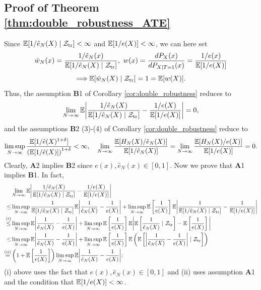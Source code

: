 \subsection{Proof of Theorem \ref{thm:double_robustness_ATE}}
Since $\mathbb{E}[1 / \hat{e}_{N}(X)\mid \mathcal{Z}_{\mathrm{tr}}] < \infty$ and
$\mathbb{E}[1 / e(X)] < \infty$, we can here set
$$\hat{w}_{N}(x) = \frac{1 / \hat{e}_{N}(x)}{\mathbb{E}[1 / \hat{e}_{N}(X)\mid
  \mathcal{Z}_{\mathrm{tr}}]}, \,\, w(x) = \frac{dP_{X}(x)}{dP_{X\mid T=1}(x)} = \frac{1 / e(x)}{\mathbb{E}[1 / e(X)]}$$
$$\Longrightarrow \mathbb{E}[\hat{w}_{N}(X)\mid \mathcal{Z}_{\mathrm{tr}}] = 1 = \mathbb{E}[w(X)].$$ 
Thus, the assumption
\textbf{B}1 of Corollary \ref{cor:double_robustness} reduces to
\[\lim_{N\rightarrow \infty}\mathbb{E}\bigg|\frac{1 / \hat{e}_{N}(X)}{\mathbb{E}[1 / \hat{e}_{N}(X)\mid \mathcal{Z}_{\mathrm{tr}}]} - \frac{1 / e(X)}{\mathbb{E}[1 / e(X)]}\bigg| = 0,\]
and the assumptions \textbf{B}2 (3)-(4) of Corollary \ref{cor:double_robustness} reduce to
\[\limsup_{N\rightarrow\infty}\frac{\mathbb{E} [1 / \hat{e}(X)^{1 + \delta}]}{\left(\mathbb{E} [1 / \hat{e}(X)]\right)^{1 + \delta}} < \infty, \quad \lim_{N\rightarrow \infty}\frac{\mathbb{E}[H_{N}(X) / \hat{e}_{N}(X)]}{\mathbb{E}[1 / \hat{e}_{N}(X)]} = \lim_{N\rightarrow \infty}\frac{\mathbb{E}[H_{N}(X) / e(X)]}{\mathbb{E}[1 / e(X)]} = 0.\]
Clearly, \textbf{A}2 implies \textbf{B}2 since
$e(x), \hat{e}_{N}(x)\in [0, 1]$. Now we prove that \textbf{A}1
implies \textbf{B}1. In fact,
\begin{align*}
  &\lim_{N\rightarrow \infty}\mathbb{E}\bigg|\frac{1 / \hat{e}_{N}(X)}{\mathbb{E}[1 / \hat{e}_{N}(X)\mid \mathcal{Z}_{\mathrm{tr}}]} - \frac{1 / e(X)}{\mathbb{E}[1 / e(X)]}\bigg| \\
  \le & \limsup_{N\rightarrow \infty}\frac{1}{\mathbb{E}[1 / \hat{e}_{N}(X)\mid \mathcal{Z}_{\mathrm{tr}}]}\mathbb{E}\bigg|\frac{1}{\hat{e}_{N}(X)} - \frac{1}{e(X)}\bigg| + \limsup_{N\rightarrow \infty}\mathbb{E} \left[\frac{1}{e(X)}\right]\mathbb{E}\bigg|\frac{1}{\mathbb{E}[1 / \hat{e}_{N}(X)\mid \mathcal{Z}_{\mathrm{tr}}]} - \frac{1}{\mathbb{E}[1 / e(X)]}\bigg|\\
  \stackrel{(i)}{\le} & \limsup_{N\rightarrow \infty}\mathbb{E}\bigg|\frac{1}{\hat{e}_{N}(X)} - \frac{1}{e(X)}\bigg| + \limsup_{N\rightarrow \infty}\mathbb{E} \left[\frac{1}{e(X)}\right]\mathbb{E} \bigg|\mathbb{E}\left[\frac{1}{\hat{e}_{N}(X)}\mid \mathcal{Z}_{\mathrm{tr}}\right] - \mathbb{E}\left[\frac{1}{e(X)}\right]\bigg|\\
  \le & \limsup_{N\rightarrow \infty}\mathbb{E}\bigg|\frac{1}{\hat{e}_{N}(X)} - \frac{1}{e(X)}\bigg| + \limsup_{N\rightarrow \infty}\mathbb{E} \left[\frac{1}{e(X)}\right]\mathbb{E}\left( \mathbb{E}\left[\bigg|\frac{1}{\hat{e}_{N}(X)} - \frac{1}{e(X)}\bigg|\mid \mathcal{Z}_{\mathrm{tr}}\right]\right)\\
  \stackrel{(ii)}{=} & \left( 1 + \mathbb{E} \left[\frac{1}{e(X)}\right]\right)\limsup_{N\rightarrow \infty}\mathbb{E}\bigg|\frac{1}{\hat{e}_{N}(X)} - \frac{1}{e(X)}\bigg|;
\end{align*}
(i) above uses the fact that $e(x), \hat{e}_{N}(x)\in [0, 1]$ and (ii)
uses assumption \textbf{A}1 and the condition that
$\mathbb{E} [1 / e(X)] < \infty$.

